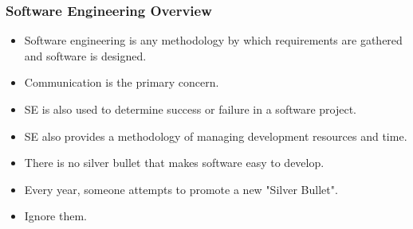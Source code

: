 \documentclass{beamer}
\begin{document}
\begin{frame}
    \frametitle{Software Engineering Overview}
    \begin{itemize}[<+->]
        \item Software engineering is any methodology by which requirements are gathered and software is designed.
        \item Communication is the primary concern.
        \item SE is also used to determine success or failure in a software project.
        \item SE also provides a methodology of managing development resources and time.
        \item There is no silver bullet that makes software easy to develop.
        \item Every year, someone attempts to promote a new "Silver Bullet".
        \item Ignore them.
    \end{itemize}
\end{frame}
\end{document}
